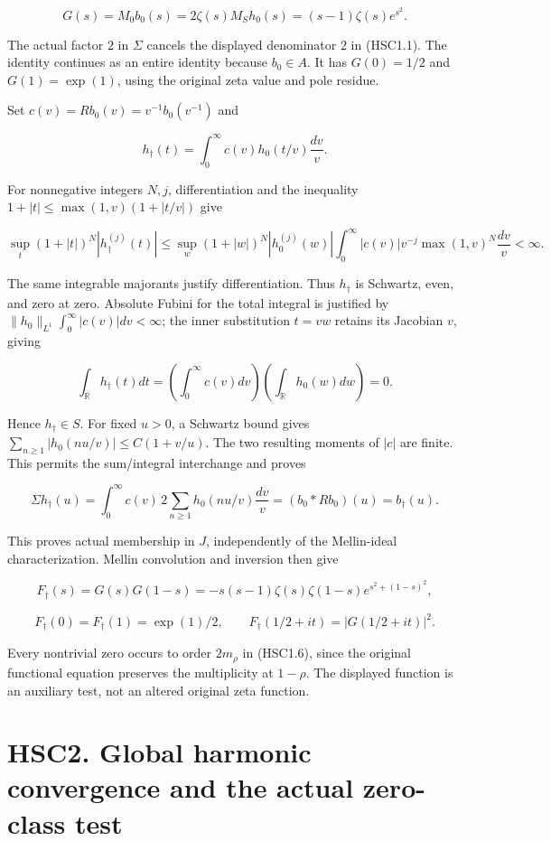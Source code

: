 \[
 G(s)=M_0b_0(s)=2\zeta(s)M_Sh_0(s)
 =(s-1)\zeta(s)e^{s^2}.
\tag{HSC1.2}
\]

The actual factor \(2\) in \(\Sigma\) cancels the displayed denominator
\(2\) in (HSC1.1). The identity continues as an entire identity because
\(b_0\in A\). It has \(G(0)=1/2\) and \(G(1)=\exp(1)\), using the
original zeta value and pole residue.

Set \(c(v)=Rb_0(v)=v^{-1}b_0(v^{-1})\) and

\[
 h_\dagger(t)=\int_0^\infty c(v)h_0(t/v)\frac{dv}{v}.
\tag{HSC1.3}
\]

For nonnegative integers \(N,j\), differentiation and the inequality
\(1+|t|\le\max(1,v)(1+|t/v|)\) give

\[
 \sup_t(1+|t|)^N|h_\dagger^{(j)}(t)|
 \le \sup_w(1+|w|)^N|h_0^{(j)}(w)|
 \int_0^\infty |c(v)|v^{-j}\max(1,v)^N\frac{dv}{v}<\infty.
\tag{HSC1.4}
\]

The same integrable majorants justify differentiation. Thus
\(h_\dagger\) is Schwartz, even, and zero at zero. Absolute Fubini for
the total integral is justified by
\(\|h_0\|_{L^1}\int_0^\infty|c(v)|dv<\infty\); the inner substitution
\(t=vw\) retains its Jacobian \(v\), giving

\[
 \int_{\mathbb R}h_\dagger(t)dt
 =\left(\int_0^\infty c(v)dv\right)
 \left(\int_{\mathbb R}h_0(w)dw\right)=0.
\]

Hence \(h_\dagger\in S\). For fixed \(u>0\), a Schwartz bound gives
\(\sum_{n\ge1}|h_0(nu/v)|\le C(1+v/u)\). The two resulting moments of
\(|c|\) are finite. This permits the sum/integral interchange and proves

\[
 \Sigma h_\dagger(u)
 =\int_0^\infty c(v)\,2\sum_{n\ge1}h_0(nu/v)\frac{dv}{v}
 =(b_0*Rb_0)(u)=b_\dagger(u).
\tag{HSC1.5}
\]

This proves actual membership in \(J\), independently of the
Mellin-ideal characterization. Mellin convolution and inversion then
give

\[
 F_\dagger(s)=G(s)G(1-s)
 =-s(s-1)\zeta(s)\zeta(1-s)e^{s^2+(1-s)^2},
\tag{HSC1.6}
\]

\[
 F_\dagger(0)=F_\dagger(1)=\exp(1)/2,\qquad
 F_\dagger(1/2+it)=|G(1/2+it)|^2.
\tag{HSC1.7}
\]

Every nontrivial zero occurs to order \(2m_\rho\) in (HSC1.6), since the
original functional equation preserves the multiplicity at \(1-\rho\).
The displayed function is an auxiliary test, not an altered original
zeta function.

\section{HSC2. Global harmonic convergence and the actual zero-class
test}\label{hsc2.-global-harmonic-convergence-and-the-actual-zero-class-test}


